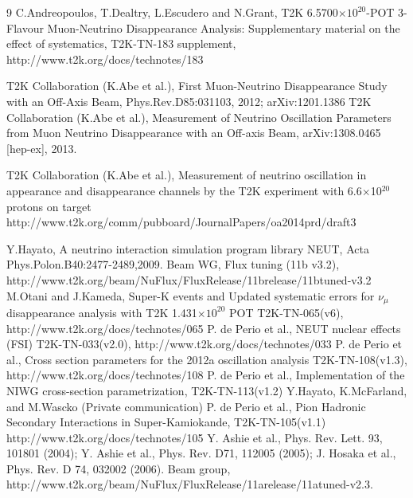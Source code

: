 \begin{thebibliography}{9}
%
%
  C.Andreopoulos, T.Dealtry, L.Escudero and N.Grant,
  T2K 6.5700$\times10^{20}$-POT 3-Flavour Muon-Neutrino Disappearance Analysis:
  Supplementary material on the effect of systematics,
  T2K-TN-183 supplement,\\
  http://www.t2k.org/docs/technotes/183

%
%
   T2K Collaboration (K.Abe et al.), 
   First Muon-Neutrino Disappearance Study with an Off-Axis Beam,
   Phys.Rev.D85:031103, 2012; arXiv:1201.1386
  T2K Collaboration (K.Abe et al.),
  Measurement of Neutrino Oscillation Parameters from Muon Neutrino Disappearance with an Off-axis Beam,
  arXiv:1308.0465 [hep-ex], 2013.
  
%
%
   T2K Collaboration (K.Abe et al.),
   Measurement of neutrino oscillation in appearance and disappearance channels by the T2K experiment with 
   6.6$\times$10$^{20}$ protons on target 
   http://www.t2k.org/comm/pubboard/JournalPapers/oa2014prd/draft3

%
%
  Y.Hayato, A neutrino interaction simulation program library NEUT,
  Acta Phys.Polon.B40:2477-2489,2009.
   Beam WG, Flux tuning (11b v3.2), http://www.t2k.org/beam/NuFlux/FluxRelease/11brelease/11btuned-v3.2
   M.Otani and J.Kameda,
   Super-K events and Updated systematic errors for $\nu_\mu$ disappearance analysis with T2K 1.431$\times10^{20}$ POT
   T2K-TN-065(v6),
   http://www.t2k.org/docs/technotes/065
  P. de Perio et al.,
  NEUT nuclear effects (FSI)
  T2K-TN-033(v2.0),
  http://www.t2k.org/docs/technotes/033
  P. de Perio et al.,
  Cross section parameters for the 2012a oscillation analysis
  T2K-TN-108(v1.3),
  http://www.t2k.org/docs/technotes/108
  P. de Perio et al.,
  Implementation of the NIWG cross-section parametrization,
  T2K-TN-113(v1.2) 
  Y.Hayato, K.McFarland, and M.Wascko (Private communication) 
  P. de Perio et al.,
  Pion Hadronic Secondary Interactions in Super-Kamiokande,
  T2K-TN-105(v1.1)
  http://www.t2k.org/docs/technotes/105
  Y. Ashie et al., Phys. Rev. Lett. 93, 101801 (2004);
  Y. Ashie et al., Phys. Rev. D71, 112005 (2005); 
  J. Hosaka et al., Phys. Rev. D 74, 032002 (2006).
  Beam group,
  http://www.t2k.org/beam/NuFlux/FluxRelease/11arelease/11atuned-v2.3.


\end{thebibliography}
